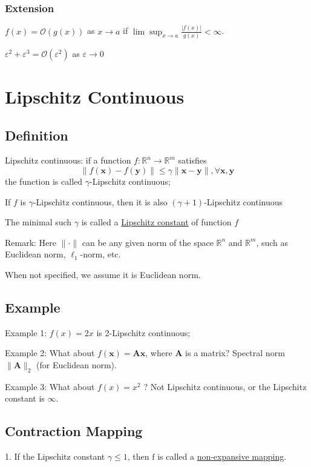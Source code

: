 \documentclass[11pt]{elegantbook}
\begin{document}
\subsection{Extension}
$f(x)=\mathcal{O}(g(x))$ as $x \rightarrow a$ if $\lim \sup_{x \rightarrow a}\frac{|f(x)|}{g(x)}<\infty$.

\begin{example}
$\varepsilon^2+\varepsilon^3=\mathcal{O}(\varepsilon^2)$ as $\varepsilon \rightarrow 0$
\end{example}

\chapter{Lipschitz Continuous}
\section{Definition}
\begin{definition}
    Lipschitz continuous: if a function $f: \mathbb{R}^{n} \rightarrow \mathbb{R}^{m}$ satisfies
    $$
    \|f(\mathbf{x})-f(\mathbf{y})\| \leq \gamma\|\mathbf{x}-\mathbf{y}\|, \forall \mathbf{x}, \mathbf{y}
    $$
    the function is called $\gamma$-Lipschitz continuous;
\end{definition}
If $f$ is $\gamma$-Lipschitz continuous, then it is also $(\gamma+1)$-Lipschitz continuous

The minimal such $\gamma$ is called a \underline{Lipschitz constant} of function $f$

Remark: Here $\|\cdot\|$ can be any given norm of the space $\mathbb{R}^{n}$ and $\mathbb{R}^{m}$, such as Euclidean norm, $\ell_{1}$-norm, etc.

When not specified, we assume it is Euclidean norm.

\section{Example}
Example 1: $f(x)=2 x$ is 2-Lipschitz continuous;

Example 2: What about $f(\mathbf{x})=\mathbf{A x}$, where $\mathbf{A}$ is a matrix? Spectral norm $\|\mathbf{A}\|_{2}$ (for Euclidean norm).

Example 3: What about $f(x)=x^{2}$ ?
Not Lipschitz continuous, or the Lipschitz constant is $\infty$.

\section{Contraction Mapping}
1. If the Lipschitz constant $\gamma \leq 1$, then $\mathrm{f}$ is called a \underline{non-expansive mapping}.
\end{document}
